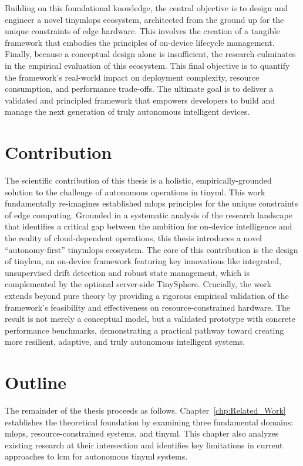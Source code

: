 Building on this foundational knowledge, the central objective is to design and engineer a novel \gls{tinymlops} ecosystem, architected from the ground up for the unique constraints of edge hardware. This involves the creation of a tangible framework that embodies the principles of on-device lifecycle management. Finally, because a conceptual design alone is insufficient, the research culminates in the empirical evaluation of this ecosystem. This final objective is to quantify the framework's real-world impact on deployment complexity, resource consumption, and performance trade-offs. The ultimate goal is to deliver a validated and principled framework that empowers developers to build and manage the next generation of truly autonomous intelligent devices.

\section{Contribution}
\label{sec:contribution}

The scientific contribution of this thesis is a holistic, empirically-grounded solution to the challenge of autonomous operations in \gls{tinyml}. This work fundamentally re-imagines established \gls{mlops} principles for the unique constraints of edge computing. Grounded in a systematic analysis of the research landscape that identifies a critical gap between the ambition for on-device intelligence and the reality of cloud-dependent operations, this thesis introduces a novel ``autonomy-first'' \gls{tinymlops} ecosystem. The core of this contribution is the design of \gls{tinylcm}, an on-device framework featuring key innovations like integrated, unsupervised drift detection and robust state management, which is complemented by the optional server-side TinySphere. Crucially, the work extends beyond pure theory by providing a rigorous empirical validation of the framework's feasibility and effectiveness on resource-constrained hardware. The result is not merely a conceptual model, but a validated prototype with concrete performance benchmarks, demonstrating a practical pathway toward creating more resilient, adaptive, and truly autonomous intelligent systems.

\section{Outline}
\label{sec:structure-of-thesis}

The remainder of the thesis proceeds as follows. Chapter~\ref{chp:Related_Work} establishes the theoretical foundation by examining three fundamental domains: \gls{mlops}, resource-constrained systems, and \gls{tinyml}. This chapter also analyzes existing research at their intersection and identifies key limitations in current approaches to \gls{lcm} for autonomous \gls{tinyml} systems.

